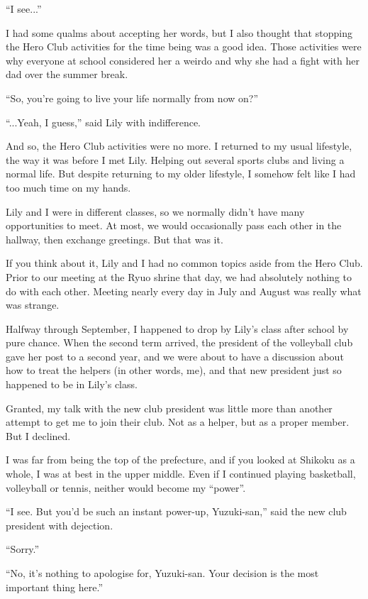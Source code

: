 ``I see...''

I had some qualms about accepting her words, but I also thought that stopping the Hero Club activities for the time being was a good idea. Those activities were why everyone at school considered her a weirdo and why she had a fight with her dad over the summer break.

``So, you're going to live your life normally from now on?''

``...Yeah, I guess,'' said Lily with indifference.

And so, the Hero Club activities were no more. I returned to my usual lifestyle, the way it was before I met Lily. Helping out several sports clubs and living a normal life. But despite returning to my older lifestyle, I somehow felt like I had too much time on my hands.

Lily and I were in different classes, so we normally didn't have many opportunities to meet. At most, we would occasionally pass each other in the hallway, then exchange greetings. But that was it.

If you think about it, Lily and I had no common topics aside from the Hero Club. Prior to our meeting at the Ryuo shrine that day, we had absolutely nothing to do with each other. Meeting nearly every day in July and August was really what was strange.

Halfway through September, I happened to drop by Lily's class after school by pure chance. When the second term arrived, the president of the volleyball club gave her post to a second year, and we were about to have a discussion about how to treat the helpers (in other words, me), and that new president just so happened to be in Lily's class.

Granted, my talk with the new club president was little more than another attempt to get me to join their club. Not as a helper, but as a proper member. But I declined.

I was far from being the top of the prefecture, and if you looked at Shikoku as a whole, I was at best in the upper middle. Even if I continued playing basketball, volleyball or tennis, neither would become my ``power''.

``I see. But you'd be such an instant power-up, Yuzuki-san,'' said the new club president with dejection.

``Sorry.''

``No, it's nothing to apologise for, Yuzuki-san. Your decision is the most important thing here.''

